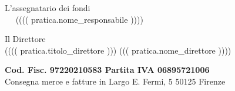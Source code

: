 \documentclass[a4paper,12pt]{letter}
\begin{document}
\begin{minipage}{\textwidth}
\begin{minipage}[t]{8cm}
\begin{center}
L'assegnatario dei fondi \\
~~ (((( pratica.nome_responsabile )))) ~~ \\
\end{center}
\end{minipage}\hfill\begin{minipage}[t]{8cm}
\begin{center}
Il Direttore \\
({}((( pratica.titolo_direttore ))) ((( pratica.nome_direttore )))) \\
\end{center}
\vspace*{25mm}
\end{minipage}
\begin{minipage}{\textwidth}
\begin{center}
{\bf Cod. Fisc. 97220210583 \hspace{1.5cm} Partita IVA 06895721006} \\
Consegna merce e fatture in Largo E. Fermi, 5 50125 Firenze
\end{center}
\end{minipage}
\end{minipage}
\end{document}
